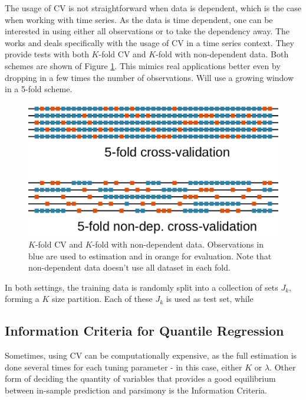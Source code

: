The usage of CV is not straightforward when data is dependent, which is the case when working with time series. As the data is time dependent, one can be interested in using either all observations or to take the dependency away. The works
\cite{bergmeir_note_2017} and \cite{bergmeir_use_2012} deals specifically with the usage of CV in a time series context. They provide tests with both $K$-fold CV and $K$-fold with non-dependent data. Both schemes are shown of Figure \ref{fig:cross-validation-scheme}.
This mimics real applications better even by dropping in a few times the number of observations. Will use a growing window in a 5-fold scheme.
\begin{figure}
	\centering
	\includegraphics[width=0.9\linewidth]{Figuras/Cross-validation-scheme}
	\caption{$K$-fold CV and $K$-fold with non-dependent data. Observations in blue are used to estimation and in orange for evaluation. Note that non-dependent data doesn't use all dataset in each fold.}
	\label{fig:cross-validation-scheme}
\end{figure}
In both settings, the training data is randomly split into a collection of sets $J_k$, forming a $K$ size partition. Each of these $J_k$ is used as test set, while 




\subsection{Information Criteria for Quantile Regression}
Sometimes, using CV can be computationally expensive, as the full estimation is done several times for each tuning parameter - in this case, either $K$ or $\lambda$. Other form of deciding the quantity of variables that provides a good equilibrium between in-sample prediction and parsimony is the Information Criteria.

